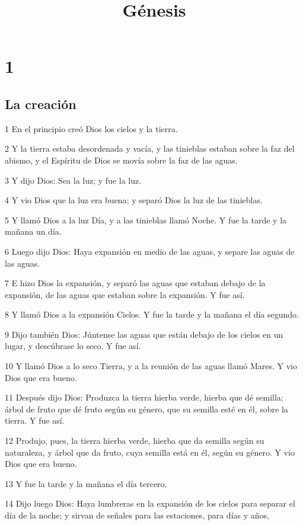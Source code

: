 

\title{Génesis}

\chapter{1}

\section*{La creación}

\par 1 En el principio creó Dios los cielos y la tierra.
\par 2 Y la tierra estaba desordenada y vacía, y las tinieblas estaban sobre la faz del abismo, y el Espíritu de Dios se movía sobre la faz de las aguas.
\par 3 Y dijo Dios: Sea la luz; y fue la luz.
\par 4 Y vio Dios que la luz era buena; y separó Dios la luz de las tinieblas.
\par 5 Y llamó Dios a la luz Día, y a las tinieblas llamó Noche. Y fue la tarde y la mañana un día.
\par 6 Luego dijo Dios: Haya expansión en medio de las aguas, y separe las aguas de las aguas.
\par 7 E hizo Dios la expansión, y separó las aguas que estaban debajo de la expansión, de las aguas que estaban sobre la expansión. Y fue así.
\par 8 Y llamó Dios a la expansión Cielos. Y fue la tarde y la mañana el día segundo.
\par 9 Dijo también Dios: Júntense las aguas que están debajo de los cielos en un lugar, y descúbrase lo seco. Y fue así.
\par 10 Y llamó Dios a lo seco Tierra, y a la reunión de las aguas llamó Mares. Y vio Dios que era bueno.
\par 11 Después dijo Dios: Produzca la tierra hierba verde, hierba que dé semilla; árbol de fruto que dé fruto según su género, que su semilla esté en él, sobre la tierra. Y fue así.
\par 12 Produjo, pues, la tierra hierba verde, hierba que da semilla según su naturaleza, y árbol que da fruto, cuya semilla está en él, según su género. Y vio Dios que era bueno.
\par 13 Y fue la tarde y la mañana el día tercero.
\par 14 Dijo luego Dios: Haya lumbreras en la expansión de los cielos para separar el día de la noche; y sirvan de señales para las estaciones, para días y años,
